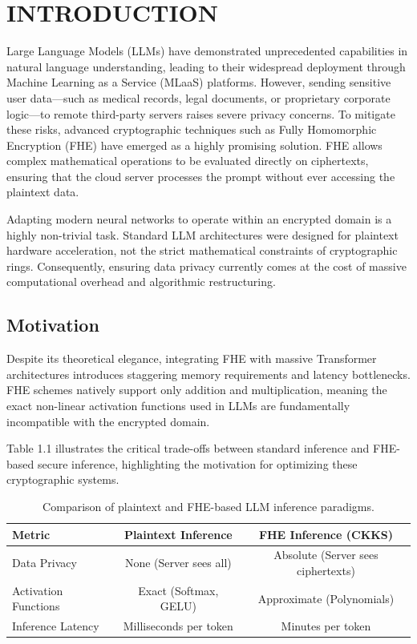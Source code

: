 \chapter{INTRODUCTION}

Large Language Models (LLMs) have demonstrated unprecedented capabilities in natural language understanding, leading to their widespread deployment through Machine Learning as a Service (MLaaS) platforms. However, sending sensitive user data—such as medical records, legal documents, or proprietary corporate logic—to remote third-party servers raises severe privacy concerns. To mitigate these risks, advanced cryptographic techniques such as Fully Homomorphic Encryption (FHE) have emerged as a highly promising solution. FHE allows complex mathematical operations to be evaluated directly on ciphertexts, ensuring that the cloud server processes the prompt without ever accessing the plaintext data.

Adapting modern neural networks to operate within an encrypted domain is a highly non-trivial task. Standard LLM architectures were designed for plaintext hardware acceleration, not the strict mathematical constraints of cryptographic rings. Consequently, ensuring data privacy currently comes at the cost of massive computational overhead and algorithmic restructuring. 

\section{Motivation}
Despite its theoretical elegance, integrating FHE with massive Transformer architectures introduces staggering memory requirements and latency bottlenecks. FHE schemes natively support only addition and multiplication, meaning the exact non-linear activation functions used in LLMs are fundamentally incompatible with the encrypted domain. 

Table 1.1 illustrates the critical trade-offs between standard inference and FHE-based secure inference, highlighting the motivation for optimizing these cryptographic systems.

\begin{table}[h]
\centering
\caption{Comparison of plaintext and FHE-based LLM inference paradigms.}
\begin{tabular}{|l|c|c|}
\hline
\textbf{Metric} & \textbf{Plaintext Inference} & \textbf{FHE Inference (CKKS)} \\ \hline
Data Privacy & None (Server sees all) & Absolute (Server sees ciphertexts) \\ \hline
Activation Functions & Exact (Softmax, GELU) & Approximate (Polynomials) \\ \hline
Inference Latency & Milliseconds per token & Minutes per token \\ \hline
\end{tabular}
\end{table}

